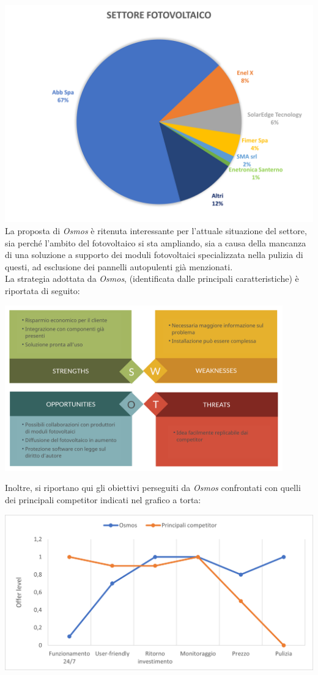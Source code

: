 \documentclass[a4paper, 12pt]{article}
\begin{document}
	\includegraphics[width=\textwidth]{Images/suddivisione_settore.png}
	La proposta di \emph{Osmos} è ritenuta interessante per l'attuale situazione del settore, sia perché l'ambito del fotovoltaico si sta ampliando, sia a causa della mancanza di una soluzione a supporto dei moduli fotovoltaici specializzata nella pulizia di questi, ad esclusione dei pannelli autopulenti già menzionati.\\
	La strategia adottata da \emph{Osmos}, (identificata dalle principali caratteristiche) è riportata di seguito:
	\begin{center}
		\includegraphics[width=0.9\textwidth]{Images/SWOT2.png}
	\end{center}
	Inoltre, si riportano qui gli obiettivi perseguiti da \emph{Osmos} confrontati con quelli dei principali competitor indicati nel grafico a torta:
	\begin{center}
		\includegraphics[width=\textwidth]{Images/curve_valore.png}
	\end{center}
\end{document}
